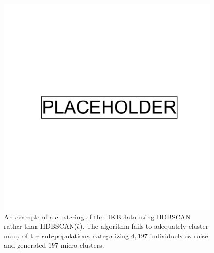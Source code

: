 \begin{figure}[ht]
  \centering
\includegraphics[width=0.7\linewidth]{placeholder.png}
  \caption[Clustering the UKB with basic HDBSCAN]{An example of a clustering of the UKB data using HDBSCAN rather than HDBSCAN($\hat{\epsilon}$). The algorithm fails to adequately cluster many of the sub-populations, categorizing $4,197$ individuals as noise and generated $197$ micro-clusters.}
    \label{fig:supp_ukb_hdbscan_original}  
\end{figure}

\clearpage

